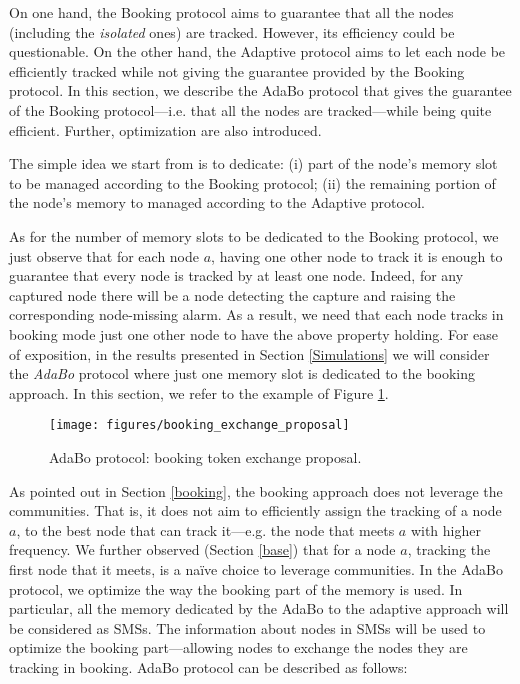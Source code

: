 \documentclass{IEEEconf}
\begin{document}
On one hand, the Booking protocol aims to guarantee that all the nodes (including the \textit{isolated} ones) are tracked. However, its efficiency could be questionable.
On the other hand, the Adaptive protocol aims to let each node be efficiently tracked while not giving the guarantee provided by the Booking protocol. In this section, we describe the AdaBo protocol that gives the guarantee of the Booking protocol---i.e. that all the nodes are tracked---while being quite efficient.
Further, optimization are also introduced.

The simple idea we start from is to dedicate: (i) part of the node's memory slot to be managed according to the Booking protocol; (ii) the remaining portion of the node's memory to managed according to the Adaptive protocol.


As for the number of memory slots to be dedicated to the Booking protocol, we just observe that for each node $a$, having one other node to track it is enough to guarantee that every node is tracked by at least one node. Indeed, for any captured node there will be a node detecting the capture and raising the corresponding node-missing alarm.
As a result, we need that each node tracks in booking mode just one other node to have the above property holding. For ease of exposition, in the results presented in Section \ref{Simulations} we will consider the {\em AdaBo} protocol where just one memory slot is dedicated to the booking approach. In this section, we refer to the example of Figure \ref{exchangeExample}.
\begin{figure}
\begin{center}
    \texttt{[image: figures/booking\_exchange\_proposal]}
\end{center}
\caption{AdaBo protocol: booking token exchange proposal.}
\label{exchangeExample}
\end{figure}



As pointed out in Section \ref{booking}, the booking approach does not leverage the communities. That is, it does not aim to efficiently assign the tracking of a node $a$, to the best node that can track it---e.g. the node that meets $a$ with higher frequency. We further observed (Section \ref{base}) that for a node $a$, tracking the first node that it meets, is a na\"ive choice to leverage communities. In the AdaBo protocol, we optimize the way the booking part of the memory is used. In particular, all the memory dedicated by the AdaBo to the adaptive approach will be considered as SMSs. The information about nodes in SMSs will be used to optimize the booking part---allowing nodes to exchange the nodes they are tracking in booking. AdaBo protocol can be described as follows:
\end{document}
